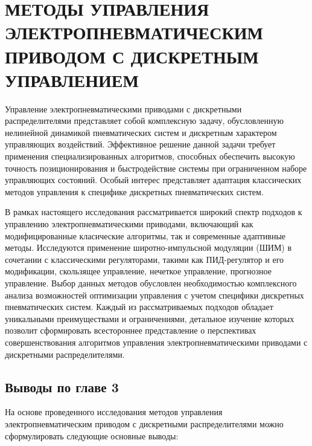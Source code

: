 \chapter{МЕТОДЫ УПРАВЛЕНИЯ ЭЛЕКТРОПНЕВМАТИЧЕСКИМ ПРИВОДОМ С ДИСКРЕТНЫМ УПРАВЛЕНИЕМ}\label{ch:ch3}
Управление электропневматическими приводами с дискретными распределителями представляет
собой комплексную задачу, обусловленную нелинейной динамикой пневматических систем и
дискретным характером управляющих воздействий. Эффективное решение данной задачи требует
применения специализированных алгоритмов, способных обеспечить высокую точность позиционирования и
быстродействие системы при ограниченном наборе управляющих состояний. Особый интерес представляет адаптация
классических методов управления к специфике дискретных пневматических систем.

В рамках настоящего исследования рассматривается широкий спектр подходов к управлению электропневматическими
приводами, включающий как модифицированные класические алгоритмы, так и современные адаптивные методы.
Исследуются применение широтно-импульсной модуляции (ШИМ)
в сочетании с классическими регуляторами, такими как ПИД-регулятор и его модификации,
скользящее управление, нечеткое управление, прогнозное управление.
Выбор данных методов обусловлен необходимостью комплексного анализа возможностей оптимизации управления
с учетом специфики дискретных пневматических систем. Каждый из рассматриваемых подходов обладает
уникальными преимуществами и ограничениями, детальное изучение которых позволит сформировать
всестороннее представление о перспективах совершенствования алгоритмов управления
электропневматическими приводами с дискретными распределителями.


% 





\section{Выводы по главе 3}
На основе проведенного исследования методов управления электропневматическим приводом с дискретными распределителями можно сформулировать следующие основные выводы:

